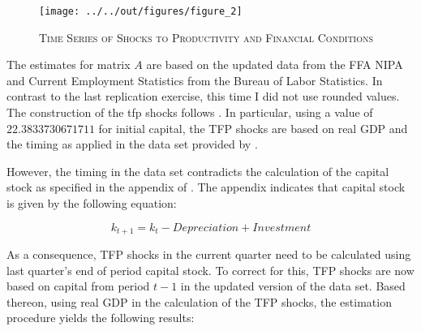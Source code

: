 \begin{figure}
    
    \centering

    \texttt{[image: ../../out/figures/figure\_2]}

    \caption{\textsc{Time Series of Shocks to Productivity and Financial Conditions}}
    
    \label{fig:figure_2}

\end{figure}



The estimates for matrix $A$ are based on the updated data from the FFA
NIPA
and Current Employment Statistics from the Bureau of Labor Statistics.
In contrast to the last replication exercise, this time I did not use rounded values. The construction of the tfp shocks follows \citet{JERMANNfinancial}. In particular, using a value of $22.3833730671711$ for initial capital, the TFP shocks are based on real GDP and the timing as applied in the data set provided by \citeauthor{JERMANNfinancial}.

However, the timing in the data set contradicts the calculation of the capital stock as specified in the appendix of \citeauthor{JERMANNfinancial}. The appendix indicates that capital stock is given by the following equation:

\begin{equation} \label{eq:capital_stock}
k_{t+1} = k_{t} - Depreciation + Investment
\end{equation} 

As a consequence, TFP shocks in the current quarter need to be calculated using last quarter's end of period capital stock. To correct for this, TFP shocks are now based on capital from period $t-1$ in the updated version of the data set. Based thereon, using real GDP in the calculation of the TFP shocks, the estimation procedure yields the following results:



